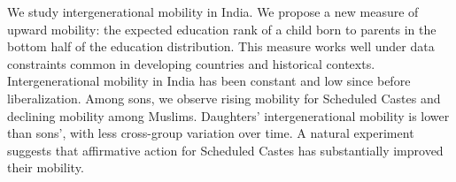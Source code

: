 We study intergenerational mobility in India.  We propose a new measure of upward mobility: the expected education rank of a child born to parents in the bottom half of the education distribution. This measure works well under data constraints common in developing countries and historical contexts. Intergenerational mobility in India has been constant and low since before liberalization. Among sons, we observe rising mobility for Scheduled Castes and declining mobility among Muslims. Daughters' intergenerational mobility is lower than sons', with less cross-group variation over time. A natural experiment suggests that affirmative action for Scheduled Castes has substantially improved their mobility.
